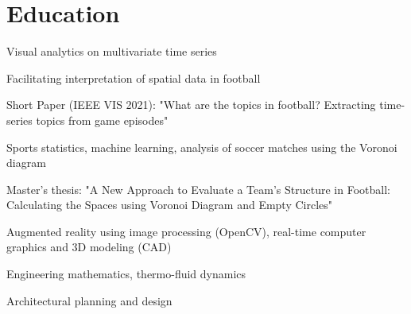 
\section{Education}

 
\begin{tightemize}
    \item Visual analytics on multivariate time series
    \item Facilitating interpretation of spatial data in football
    \item Short Paper (IEEE VIS 2021): "What are the topics in football? Extracting time-series topics from game episodes"
\end{tightemize}

\sectionsep

 
\begin{tightemize}
    \item Sports statistics, machine learning, analysis of soccer matches using the Voronoi diagram
    \item Master's thesis: "A New Approach to Evaluate a Team's Structure in Football: Calculating the Spaces using Voronoi Diagram and Empty Circles"
\end{tightemize}

\sectionsep

 
\begin{tightemize}
    \item Augmented reality using image processing (OpenCV), real-time computer graphics and 3D modeling (CAD)
\end{tightemize}

\sectionsep

 
\begin{tightemize}
    \item Engineering mathematics, thermo-fluid dynamics
    \item Architectural planning and design
\end{tightemize}

\sectionsep

\vspace{3mm}

